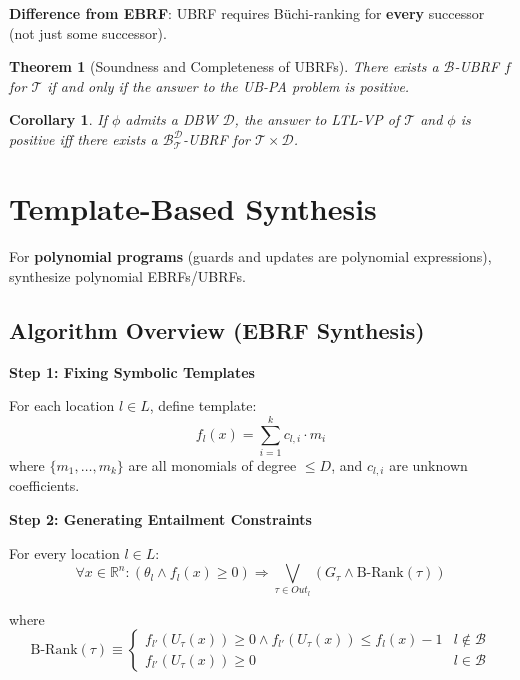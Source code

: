 \documentclass{article}
\newtheorem{theorem}{Theorem}
\newtheorem{corollary}{Corollary}
\begin{document}
\begin{enumerate}
\textbf{Difference from EBRF}: UBRF requires Büchi-ranking for \textbf{every} successor (not just some successor).

\begin{theorem}[Soundness and Completeness of UBRFs]
There exists a $\mathcal{B}$-UBRF $f$ for $\mathcal{T}$ if and only if the answer to the UB-PA problem is positive.
\end{theorem}

\begin{corollary}
If $\phi$ admits a DBW $\mathcal{D}$, the answer to LTL-VP of $\mathcal{T}$ and $\phi$ is positive iff there exists a $\mathcal{B}_{\mathcal{T}}^{\mathcal{D}}$-UBRF for $\mathcal{T} \times \mathcal{D}$.
\end{corollary}

\section{Template-Based Synthesis}

For \textbf{polynomial programs} (guards and updates are polynomial expressions), synthesize polynomial EBRFs/UBRFs.

\subsection{Algorithm Overview (EBRF Synthesis)}

\textbf{Step 1: Fixing Symbolic Templates}

For each location $l \in L$, define template:
\begin{equation}
f_l(x) = \sum_{i=1}^k c_{l,i} \cdot m_i
\end{equation}
where $\{m_1, \ldots, m_k\}$ are all monomials of degree $\leq D$, and $c_{l,i}$ are unknown coefficients.

\textbf{Step 2: Generating Entailment Constraints}

For every location $l \in L$:
\begin{equation}
\forall x \in \mathbb{R}^n: (\theta_l \land f_l(x) \geq 0) \Rightarrow \bigvee_{\tau \in Out_l} (G_\tau \land \text{B-Rank}(\tau))
\end{equation}

where
\begin{equation}
\text{B-Rank}(\tau) \equiv \begin{cases}
f_{l'}(U_\tau(x)) \geq 0 \land f_{l'}(U_\tau(x)) \leq f_l(x) - 1 & l \notin \mathcal{B}\\
f_{l'}(U_\tau(x)) \geq 0 & l \in \mathcal{B}
\end{cases}
\end{equation}


\end{enumerate}
\end{document}
